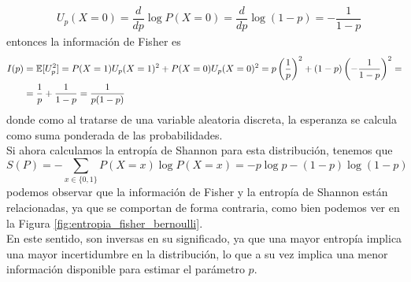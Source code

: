 \begin{ejemplo}
\begin{enumerate}
\begin{align*}
            &U_p(X=0)=\dfrac{d}{dp} \log P(X=0)=\dfrac{d}{dp} \log(1-p) = -\dfrac{1}{1-p}
        \end{align*}
        entonces la información de Fisher es
        \begin{align*}
            I(p) &= \mathbb{E}[U_p^2] = P(X=1) U_p(X=1)^2 + P(X=0) U_p(X=0)^2 = p \left( \dfrac{1}{p} \right)^2 + (1-p) \left( -\dfrac{1}{1-p} \right)^2 = \\
            &= \dfrac{1}{p} + \dfrac{1}{1-p} = \dfrac{1}{p(1-p)}
        \end{align*}
        donde como al tratarse de una variable aleatoria discreta, la esperanza se calcula como suma ponderada de las probabilidades. \\
        Si ahora calculamos la entropía de Shannon para esta distribución, tenemos que
        \begin{equation*}
            S(P) = - \sum\limits_{x\in \{0,1\}} P(X=x) \log P(X=x) = -p \log p - (1-p) \log(1-p) 
        \end{equation*}
        podemos observar que la información de Fisher y la entropía de Shannon están relacionadas, ya que se comportan de forma contraria, como bien podemos ver en la Figura \ref{fig:entropia_fisher_bernoulli}. \\
        \noindent
        En este sentido, son inversas en su significado, ya que una mayor entropía implica una mayor incertidumbre en la distribución, lo que a su vez implica una menor información disponible para estimar el parámetro $p$.
        \begin{figure}[H]
            \centering
\end{figure}
\end{enumerate}
\end{ejemplo}
